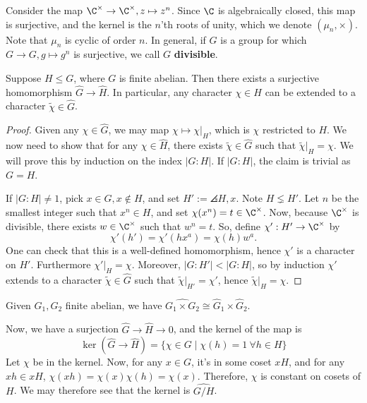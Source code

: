 Consider the map $\C ^\times \to \C^\times, z \mapsto z^n$. Since $\C$ is algebraically closed, this map is surjective, and the kernel is the $n$'th roots of unity, which we denote $(\mu _n, \times)$. Note that $\mu_n$ is cyclic of order $n$. In general, if $G$ is a group for which $G \to G, g \mapsto g^n$ is surjective, we call $G$ \textbf{divisible}.

\begin{prop}
    Suppose $H \leq G$, where $G$ is finite abelian. Then there exists a surjective homomorphism $\hat G \to \hat H$. In particular, any character $\chi \in H$ can be extended to a character $\tilde \chi \in \hat G$.
\end{prop}

\begin{proof}
    Given any $\chi \in \hat G$, we may map $\chi \mapsto \chi |_H$, which is $\chi$ restricted to $H$. We now need to show that for any $\chi \in \hat H$, there exists $\tilde \chi\in \hat G$ such that $\tilde \chi |_H = \chi$. We will prove this by induction on the index $|G:H|$. If $|G:H|$, the claim is trivial as $G=H$.

    If $|G:H| \neq 1$, pick $x \in G,x \not \in H$, and set $H':= \angles{H,x}$. Note $H \lneq H'$. Let $n$ be the smallest integer such that $x^n \in H$, and set $\chi(x^n) = t \in \C^\times$. Now, because $\C^\times$ is divisible, there exists $w \in \C^\times$ such that $w^n=t$. So, define $\chi ':H' \to \C^\times$ by
    $$\chi' (h')=\chi '(hx^a)=\chi(h)w^a.$$
    One can check that this is a well-defined homomorphism, hence $\chi '$ is a character on $H'$. Furthermore $\chi ' |_H = \chi $. Moreover, $|G:H'|<|G:H|$, so by induction $\chi '$ extends to a character $\tilde \chi \in \hat G$ such that $\tilde \chi |_{H'}=\chi '$, hence $\tilde \chi |_H = \chi$.
\end{proof}

\begin{prop}
    Given $G_1,G_2$ finite abelian, we have $\widehat{G_1 \times G_2} \cong \hat G_1 \times \hat G_2$.
\end{prop}

Now, we have a surjection $\hat G \to \hat H \to 0$, and the kernel of the map is
$$\ker (\hat G \to \hat H) = \{ \chi \in G\mid \chi (h) =1 \: \forall h \in H\}$$
Let $\chi$ be in the kernel. Now, for any $x \in G$, it's in some coset $xH$, and for any $xh \in xH$, $\chi(xh)=\chi(x)\chi(h)=\chi(x)$. Therefore, $\chi$ is constant on cosets of $H$. We may therefore see that the kernel is $\widehat{G/H}$.

